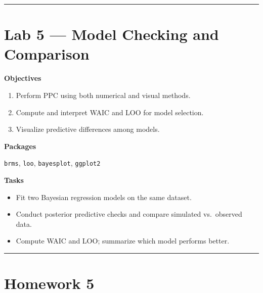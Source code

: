 \documentclass[
  letterpaper,
  DIV=11,
  numbers=noendperiod]{scrreprt}
\providecommand{\tightlist}{%
  \setlength{\itemsep}{0pt}\setlength{\parskip}{0pt}}
\begin{document}
\begin{center}\rule{0.5\linewidth}{0.5pt}\end{center}

\section{Lab 5 --- Model Checking and
Comparison}\label{lab-5-model-checking-and-comparison}

\textbf{Objectives}

\begin{enumerate}
\def\labelenumi{\arabic{enumi}.}
\tightlist
\item
  Perform PPC using both numerical and visual methods.\\
\item
  Compute and interpret WAIC and LOO for model selection.\\
\item
  Visualize predictive differences among models.
\end{enumerate}

\textbf{Packages}

\texttt{brms}, \texttt{loo}, \texttt{bayesplot}, \texttt{ggplot2}

\textbf{Tasks}

\begin{itemize}
\tightlist
\item
  Fit two Bayesian regression models on the same dataset.\\
\item
  Conduct posterior predictive checks and compare simulated vs.~observed
  data.\\
\item
  Compute WAIC and LOO; summarize which model performs better.
\end{itemize}

\begin{center}\rule{0.5\linewidth}{0.5pt}\end{center}

\section{Homework 5}\label{homework-5}
\end{document}
